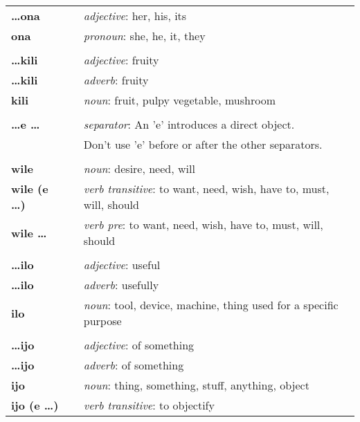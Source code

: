 \begin{supertabular}{p{2,5cm}|ll}
\textbf{\dots ona} && \textit{adjective}: her, his, its \\  %
\textbf{ona} && \textit{pronoun}: she, he, it, they \\ %
 && \\ %
\textbf{\dots kili} && \textit{adjective}: fruity \\ %
\textbf{\dots kili} && \textit{adverb}: fruity \\ %
\textbf{kili} && \textit{noun}: fruit, pulpy vegetable, mushroom \\ %
 && \\ %
\textbf{\dots e \dots} && \textit{separator}: An 'e' introduces a direct object. \\ && Don't use 'e' before or after the other separators. \\ %
 && \\ %
\textbf{wile} && \textit{noun}: desire, need, will \\ %
\textbf{wile (e \dots)} && \textit{verb transitive}: to want, need, wish, have to, must, will, should \\ %
\textbf{wile \dots} && \textit{verb pre}: to want, need, wish, have to, must, will, should \\ %
 && \\ %
\textbf{\dots ilo} && \textit{adjective}: useful \\ %
\textbf{\dots ilo} && \textit{adverb}: usefully \\ %
\textbf{ilo} && \textit{noun}: tool, device, machine, thing used for a specific purpose \\ %
 && \\ %
\textbf{\dots ijo} && \textit{adjective}: of something \\ %
\textbf{\dots ijo} && \textit{adverb}: of something \\ %
\textbf{ijo} && \textit{noun}: thing, something, stuff, anything, object \\ %
\textbf{ijo (e \dots)} && \textit{verb transitive}: to objectify \\ %

\end{supertabular}
